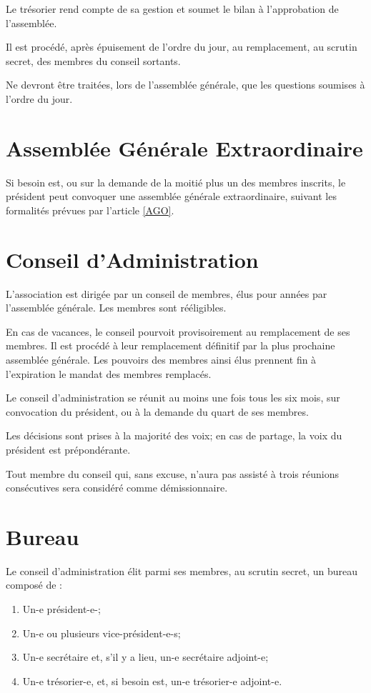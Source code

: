 \documentclass[12pt]{constitution}
\def\tailleCA{} %
\def\dureeMandatCA{} %
\begin{document}
Le trésorier rend compte de sa gestion et soumet le bilan à l’approbation de l’assemblée.

Il est procédé, après épuisement de l’ordre du jour, au remplacement, au scrutin secret, des membres du conseil sortants.

\medskip
Ne devront être traitées, lors de l’assemblée générale, que les questions soumises à l’ordre du jour.

\section{Assemblée Générale Extraordinaire}
Si besoin est, ou sur la demande de la moitié plus un des membres inscrits, le président peut convoquer une assemblée générale extraordinaire, suivant les formalités prévues par l’article \ref{AGO}.

\section{Conseil d'Administration}
L'association est dirigée par un conseil de \tailleCA membres, élus pour \dureeMandatCA années par l'assemblée générale. Les membres sont rééligibles.

En cas de vacances, le conseil pourvoit provisoirement au remplacement de ses membres. Il est procédé à leur remplacement définitif par la plus prochaine assemblée générale. Les pouvoirs des membres ainsi élus prennent fin à l'expiration le mandat des membres remplacés.

\medskip
Le conseil d'administration se réunit au moins une fois tous les six mois, sur convocation du président, ou à la demande du quart de ses membres.

Les décisions sont prises à la majorité des voix; en cas de partage, la voix du président est prépondérante. 

\medskip
Tout membre du conseil qui, sans excuse, n'aura pas assisté à trois réunions consécutives sera considéré comme démissionnaire. 

\section{Bureau}
Le conseil d'administration élit parmi ses membres, au scrutin secret, un bureau composé de :
\begin{enumerate}
	\item Un-e président-e-;
	\item Un-e ou plusieurs vice-président-e-s;
	\item Un-e secrétaire et, s'il y a lieu, un-e secrétaire adjoint-e;
	\item Un-e trésorier-e, et, si besoin est, un-e trésorier-e adjoint-e. 
\end{enumerate}
\end{document}
